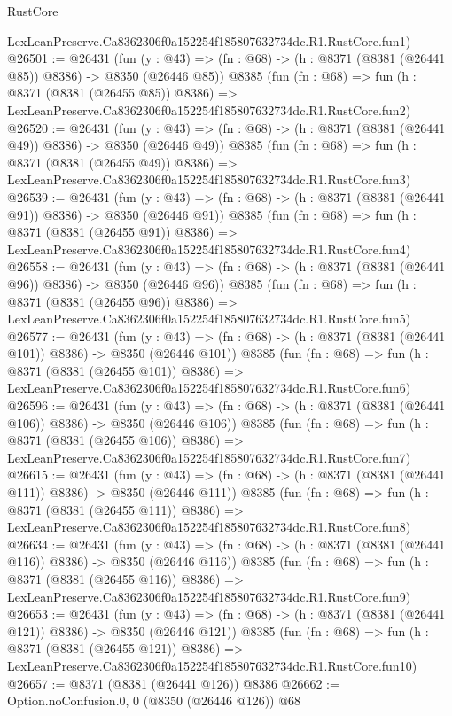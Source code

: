 \begin{lexlean}{RustCore}
\begin{coremodule}
    LexLeanPreserve.Ca8362306f0a152254f185807632734dc.R1.RustCore.fun1)
@26501 := @26431
    (fun (y : @43) => (fn : @68) -> (h : @8371 (@8381 (@26441 @85)) @8386) -> @8350 (@26446 @85))
    @8385
    (fun (fn : @68) =>
    fun (h : @8371 (@8381 (@26455 @85)) @8386) =>
    LexLeanPreserve.Ca8362306f0a152254f185807632734dc.R1.RustCore.fun2)
@26520 := @26431
    (fun (y : @43) => (fn : @68) -> (h : @8371 (@8381 (@26441 @49)) @8386) -> @8350 (@26446 @49))
    @8385
    (fun (fn : @68) =>
    fun (h : @8371 (@8381 (@26455 @49)) @8386) =>
    LexLeanPreserve.Ca8362306f0a152254f185807632734dc.R1.RustCore.fun3)
@26539 := @26431
    (fun (y : @43) => (fn : @68) -> (h : @8371 (@8381 (@26441 @91)) @8386) -> @8350 (@26446 @91))
    @8385
    (fun (fn : @68) =>
    fun (h : @8371 (@8381 (@26455 @91)) @8386) =>
    LexLeanPreserve.Ca8362306f0a152254f185807632734dc.R1.RustCore.fun4)
@26558 := @26431
    (fun (y : @43) => (fn : @68) -> (h : @8371 (@8381 (@26441 @96)) @8386) -> @8350 (@26446 @96))
    @8385
    (fun (fn : @68) =>
    fun (h : @8371 (@8381 (@26455 @96)) @8386) =>
    LexLeanPreserve.Ca8362306f0a152254f185807632734dc.R1.RustCore.fun5)
@26577 := @26431
    (fun (y : @43) => (fn : @68) -> (h : @8371 (@8381 (@26441 @101)) @8386) -> @8350 (@26446 @101))
    @8385
    (fun (fn : @68) =>
    fun (h : @8371 (@8381 (@26455 @101)) @8386) =>
    LexLeanPreserve.Ca8362306f0a152254f185807632734dc.R1.RustCore.fun6)
@26596 := @26431
    (fun (y : @43) => (fn : @68) -> (h : @8371 (@8381 (@26441 @106)) @8386) -> @8350 (@26446 @106))
    @8385
    (fun (fn : @68) =>
    fun (h : @8371 (@8381 (@26455 @106)) @8386) =>
    LexLeanPreserve.Ca8362306f0a152254f185807632734dc.R1.RustCore.fun7)
@26615 := @26431
    (fun (y : @43) => (fn : @68) -> (h : @8371 (@8381 (@26441 @111)) @8386) -> @8350 (@26446 @111))
    @8385
    (fun (fn : @68) =>
    fun (h : @8371 (@8381 (@26455 @111)) @8386) =>
    LexLeanPreserve.Ca8362306f0a152254f185807632734dc.R1.RustCore.fun8)
@26634 := @26431
    (fun (y : @43) => (fn : @68) -> (h : @8371 (@8381 (@26441 @116)) @8386) -> @8350 (@26446 @116))
    @8385
    (fun (fn : @68) =>
    fun (h : @8371 (@8381 (@26455 @116)) @8386) =>
    LexLeanPreserve.Ca8362306f0a152254f185807632734dc.R1.RustCore.fun9)
@26653 := @26431
    (fun (y : @43) => (fn : @68) -> (h : @8371 (@8381 (@26441 @121)) @8386) -> @8350 (@26446 @121))
    @8385
    (fun (fn : @68) =>
    fun (h : @8371 (@8381 (@26455 @121)) @8386) =>
    LexLeanPreserve.Ca8362306f0a152254f185807632734dc.R1.RustCore.fun10)
@26657 := @8371 (@8381 (@26441 @126)) @8386
@26662 := Option.noConfusion.{0, 0} (@8350 (@26446 @126)) @68

\end{coremodule}
\end{lexlean}
